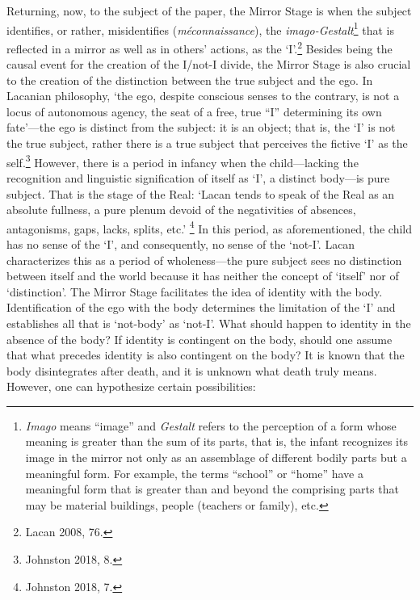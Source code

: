 Returning, now, to the subject of the paper, the Mirror Stage is when
the subject identifies, or rather, misidentifies
(\emph{méconnaissance}), the \emph{imago-Gestalt}\footnote{\emph{Imago}
  means ``image'' and \emph{Gestalt} refers to the perception of a form
  whose meaning is greater than the sum of its parts, that is, the
  infant recognizes its image in the mirror not only as an assemblage of
  different bodily parts but a meaningful form. For example, the terms
  ``school'' or ``home'' have a meaningful form that is greater than and
  beyond the comprising parts that may be material buildings, people
  (teachers or family), etc.} that is reflected in a mirror as well as
in others' actions, as the `I'.\footnote{Lacan 2008, 76.} Besides being the
causal event for the creation of the I/not-I divide, the Mirror Stage is
also crucial to the creation of the distinction between the true subject
and the ego. In Lacanian philosophy, `the ego, despite conscious senses
to the contrary, is not a locus of autonomous agency, the seat of a
free, true ``I'' determining its own fate'---the ego is distinct from
the subject: it is an object; that is, the `I' is not the true subject,
rather there is a true subject that perceives the fictive `I' as the
self.\footnote{Johnston 2018, 8.} However, there is a period in infancy when the
child---lacking the recognition and linguistic signification of itself
as `I', a distinct body---is pure subject. That is the stage of the
Real: `Lacan tends to speak of the Real as an absolute fullness, a pure
plenum devoid of the negativities of absences, antagonisms, gaps, lacks,
splits, etc.' \footnote{Johnston 2018, 7.} In this period, as aforementioned, the
child has no sense of the `I', and consequently, no sense of the
`not-I'. Lacan characterizes this as a period of wholeness---the pure
subject sees no distinction between itself and the world because it has
neither the concept of `itself' nor of `distinction'. The Mirror Stage
facilitates the idea of identity with the body. Identification of the
ego with the body determines the limitation of the `I' and establishes
all that is `not-body' as `not-I'. What should happen to identity in the
absence of the body? If identity is contingent on the body, should one
assume that what precedes identity is also contingent on the body? It is
known that the body disintegrates after death, and it is unknown what
death truly means. However, one can hypothesize certain possibilities:

